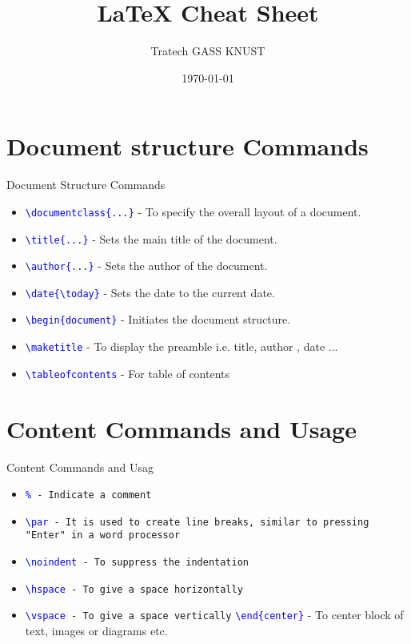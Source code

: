 \documentclass{beamer}
\title{LaTeX Cheat Sheet}
\author{Tratech GASS KNUST}
\date{\today}
\begin{document}
	
	\begin{frame}
		\titlepage
	\end{frame}
	
	\begin{frame}
		\tableofcontents
	\end{frame}
	
	\section{Document structure Commands}
	\begin{frame}{ Document Structure Commands}
		\begin{itemize}
			\item \texttt{\textcolor{blue}{\textbackslash documentclass\{...\}}} - To specify the overall layout of a document.
			\item \texttt{\textcolor{blue}{\textbackslash title\{...\}}} - Sets the main title of the document.
			\item \texttt{\textcolor{blue}{\textbackslash author\{...\}}} - Sets the author of the document.
			\item \texttt{\textcolor{blue}{\textbackslash date\{\textbackslash today\}}} - Sets the date to the current date.
			\item \texttt{\textcolor{blue}{\textbackslash begin\{document\}}} - Initiates the document structure.
			\item \texttt{\textcolor{blue}{\textbackslash maketitle}} - To display the preamble i.e. title, author , date ...
			\item \texttt{\textcolor{blue}{\textbackslash tableofcontents}} - For table of contents
		\end{itemize}
		
	\end{frame}
	
	\section{Content Commands and Usage}
	\begin{frame}{ Content Commands and Usag}
		\begin{itemize}
			\item \texttt{\textcolor{blue}{\%} - Indicate a comment}
			\item \texttt{\textcolor{blue}{\textbackslash par} -  It is used to create line breaks, similar to pressing "Enter" in a word processor}
			\item \texttt{\textcolor{blue}{\textbackslash noindent} - To suppress the indentation}
			\item \texttt{\textcolor{blue}{\textbackslash hspace} - To give a space horizontally}
			\item \texttt{\textcolor{blue}{\textbackslash vspace} - To give a space vertically}
			\texttt{\textcolor{blue}{\textbackslash end\{center\}}} - To center block of text, images or diagrams etc.
		\end{itemize}
	\end{frame}
\end{document}
